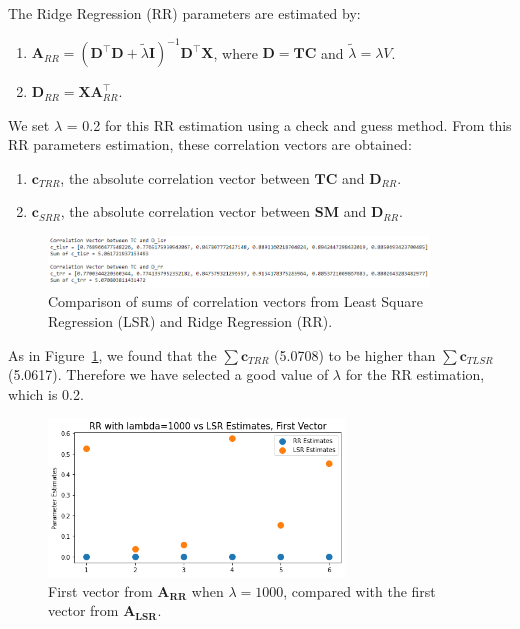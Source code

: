 \documentclass[11pt]{article}
\def\*#1{\mathbf{#1}}
\begin{document}
The Ridge Regression (RR) parameters are estimated by:

\begin{enumerate}
    \item $ \*A_{RR} = (\*D^\top \*D + \tilde{\lambda} \*I )^{-1} \*D^\top \*X $, where $ \*D = \*{TC}$ and $\tilde{\lambda} = \lambda V$.
    \item $ \*D_{RR} = \*X \*A^\top_{RR}$.
    
\end{enumerate}

We set $\lambda$ = 0.2 for this RR estimation using a check and guess method. From this RR parameters estimation, these correlation vectors are obtained:

\begin{enumerate}
    \item $\mathbf{c}_{TRR}$, the absolute correlation vector between $\*{TC}$ and $\*D_{RR}$.
    \item $\mathbf{c}_{SRR}$, the absolute correlation vector between $\*{SM}$ and $\*D_{RR}$.
\end{enumerate}

    \begin{figure}[H]
        \begin{center}
            \includegraphics[width=0.9\textwidth]{../plots/2_2_ctlsr_ctrr_sums}
        \caption{Comparison of sums of correlation vectors from Least Square Regression (LSR) and Ridge Regression (RR).}
        \label{fig:corrvec_lrs_rr}
        \end{center}
    \end{figure}



As in Figure~\ref{fig:corrvec_lrs_rr}, we found that the $\sum \mathbf{c}_{TRR}$ (5.0708) to be higher than $\sum \mathbf{c}_{TLSR}$ (5.0617). Therefore we have selected a good value of $\lambda$ for the RR estimation, which is 0.2.

    \begin{figure}[H]
        \begin{center}
            \includegraphics[width=0.7\textwidth]{../plots/2_2_rr1000_vs_lsr}
        \caption{First vector from $\*{A_{RR}}$ when $\lambda=1000$, compared with the first vector from $\*{A_{LSR}}$.}
        \label{fig:lrs_vs_rr_1000}
        \end{center}
    \end{figure}
\end{document}
